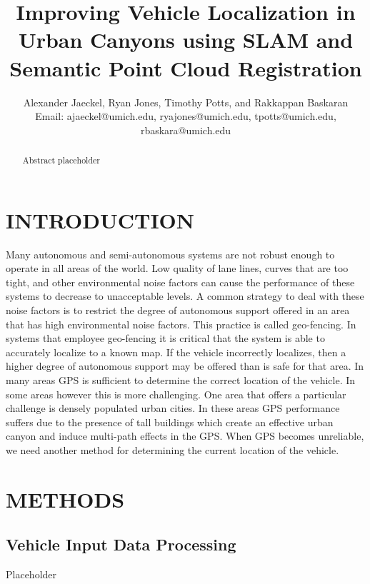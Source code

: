 \documentclass[letterpaper, 10 pt, conference]{ieeeconf}  %
\title{\LARGE \bf
Improving Vehicle Localization in Urban Canyons using SLAM and Semantic Point Cloud Registration
}
\author{Alexander Jaeckel, Ryan Jones, Timothy Potts, and Rakkappan Baskaran\\%
Email: ajaeckel@umich.edu, ryajones@umich.edu, tpotts@umich.edu, rbaskara@umich.edu
}
\begin{document}
\maketitle
\thispagestyle{empty}
\pagestyle{empty}


\begin{abstract}

Abstract placeholder

\end{abstract}


\section{INTRODUCTION}

Many autonomous and semi-autonomous systems are not robust enough to operate in all areas of the world. Low quality of lane lines, curves that are too tight, and other environmental noise factors can cause the performance of these systems to decrease to unacceptable levels. A common strategy to deal with these noise factors is to restrict the degree of autonomous support offered in an area that has high environmental noise factors. This practice is called geo-fencing. In systems that employee geo-fencing it is critical that the system is able to accurately localize to a known map. If the vehicle incorrectly localizes, then a higher degree of autonomous support may be offered than is safe for that area. In many areas GPS is sufficient to determine the correct location of the vehicle. In some areas however this is more challenging. One area that offers a particular challenge is densely populated urban cities.  In these areas GPS performance suffers due to the presence of tall buildings which create an effective urban canyon and induce multi-path effects in the GPS. When GPS becomes unreliable, we need another method for determining the current location of the vehicle.

\section{METHODS}

\subsection{Vehicle Input Data Processing}

Placeholder
\end{document}
